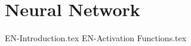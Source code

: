 \chapterspaceabove{6.75cm} %
\chapterspacebelow{7.25cm} %


\chapter{Neural Network}

{EN-Introduction.tex}
{EN-Activation Functions.tex}
